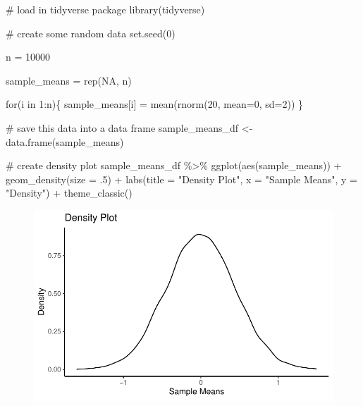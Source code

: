 \documentclass[
  letterpaper,
  DIV=11,
  numbers=noendperiod]{scrreprt}
\newenvironment{Shaded}{\begin{snugshade}}{\end{snugshade}}
\newcommand{\AttributeTok}[1]{\textcolor[rgb]{0.40,0.45,0.13}{#1}}
\newcommand{\CommentTok}[1]{\textcolor[rgb]{0.37,0.37,0.37}{#1}}
\newcommand{\ConstantTok}[1]{\textcolor[rgb]{0.56,0.35,0.01}{#1}}
\newcommand{\ControlFlowTok}[1]{\textcolor[rgb]{0.00,0.23,0.31}{#1}}
\newcommand{\DecValTok}[1]{\textcolor[rgb]{0.68,0.00,0.00}{#1}}
\newcommand{\FunctionTok}[1]{\textcolor[rgb]{0.28,0.35,0.67}{#1}}
\newcommand{\NormalTok}[1]{\textcolor[rgb]{0.00,0.23,0.31}{#1}}
\newcommand{\OtherTok}[1]{\textcolor[rgb]{0.00,0.23,0.31}{#1}}
\newcommand{\SpecialCharTok}[1]{\textcolor[rgb]{0.37,0.37,0.37}{#1}}
\newcommand{\StringTok}[1]{\textcolor[rgb]{0.13,0.47,0.30}{#1}}
\begin{document}
\begin{Shaded}
\begin{Highlighting}[]
\CommentTok{\# load in tidyverse package}
\FunctionTok{library}\NormalTok{(tidyverse)}

\CommentTok{\# create some random data}
\FunctionTok{set.seed}\NormalTok{(}\DecValTok{0}\NormalTok{)}

\NormalTok{n }\OtherTok{=} \DecValTok{10000}

\NormalTok{sample\_means }\OtherTok{=} \FunctionTok{rep}\NormalTok{(}\ConstantTok{NA}\NormalTok{, n)}

\ControlFlowTok{for}\NormalTok{(i }\ControlFlowTok{in} \DecValTok{1}\SpecialCharTok{:}\NormalTok{n)\{}
\NormalTok{  sample\_means[i] }\OtherTok{=} \FunctionTok{mean}\NormalTok{(}\FunctionTok{rnorm}\NormalTok{(}\DecValTok{20}\NormalTok{, }\AttributeTok{mean=}\DecValTok{0}\NormalTok{, }\AttributeTok{sd=}\DecValTok{2}\NormalTok{))}
\NormalTok{\}}

\CommentTok{\# save this data into a data frame }
\NormalTok{sample\_means\_df }\OtherTok{\textless{}{-}} \FunctionTok{data.frame}\NormalTok{(sample\_means)}

\CommentTok{\# create density plot }
\NormalTok{sample\_means\_df }\SpecialCharTok{\%\textgreater{}\%}
   \FunctionTok{ggplot}\NormalTok{(}\FunctionTok{aes}\NormalTok{(sample\_means)) }\SpecialCharTok{+} 
   \FunctionTok{geom\_density}\NormalTok{(}\AttributeTok{size =}\NormalTok{ .}\DecValTok{5}\NormalTok{) }\SpecialCharTok{+}
   \FunctionTok{labs}\NormalTok{(}\AttributeTok{title =} \StringTok{"Density Plot"}\NormalTok{, }\AttributeTok{x =} \StringTok{"Sample Means"}\NormalTok{, }\AttributeTok{y =} \StringTok{"Density"}\NormalTok{) }\SpecialCharTok{+} 
   \FunctionTok{theme\_classic}\NormalTok{()}
\end{Highlighting}
\end{Shaded}

\begin{figure}[H]

{\centering \includegraphics{./visualizing-data_files/figure-pdf/unnamed-chunk-1-1.pdf}

}

\end{figure}
\end{document}

